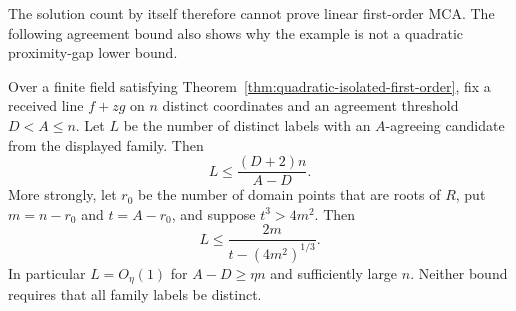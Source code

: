 The solution count by itself therefore cannot prove linear
first-order MCA. The following agreement bound also shows why the
example is not a quadratic proximity-gap lower bound.

\begin{proposition}
\label{prop:isolated-family-mca}
Over a finite field satisfying Theorem~\ref{thm:quadratic-isolated-first-order},
fix a received line $f+zg$ on $n$ distinct coordinates and an agreement
threshold $D<A\le n$. Let $L$ be the number of distinct labels with
an $A$-agreeing candidate from the displayed family. Then
\[
 L\le \frac{(D+2)n}{A-D}.
\]
More strongly, let $r_0$ be the number of domain points that are
roots of $R$, put $m=n-r_0$ and $t=A-r_0$, and suppose $t^3>4m^2$.
Then
\[
 L\le \frac{2m}{t-(4m^2)^{1/3}}.
\]
In particular $L=O_\eta(1)$ for $A-D\ge\eta n$ and sufficiently
large $n$. Neither bound requires that all family labels be distinct.
\end{proposition}
